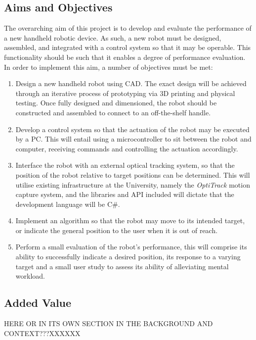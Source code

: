 \documentclass[11pt]{article}
\begin{document}
\subsection{Aims and Objectives}
The overarching aim of this project is to develop and evaluate the performance of a new handheld robotic device. As such, a new robot must be designed, assembled, and integrated with a control system so that it may be operable. This functionality should be such that it enables a degree of performance evaluation. In order to implement this aim, a number of objectives must be met:
\begin{enumerate}
\item{Design a new handheld robot using CAD. The exact design will be achieved through an iterative process of prototyping via 3D printing and physical testing. Once fully designed and dimensioned, the robot should be constructed and assembled to connect to an off-the-shelf handle.}
\item{Develop a control system so that the actuation of the robot may be executed by a PC. This will entail using a microcontroller to sit between the robot and computer, receiving commands and controlling the actuation accordingly.}
\item{Interface the robot with an external optical tracking system, so that the position of the robot relative to target positions can be determined. This will utilise existing infrastructure at the University, namely the \textit{OptiTrack} motion capture system, and the libraries and API included will dictate that the development language will be C\#.}
\item{Implement an algorithm so that the robot may move to its intended target, or indicate the general position to the user when it is out of reach.}
\item{Perform a small evaluation of the robot's performance, this will comprise its ability to successfully indicate a desired position, its response to a varying target and a small user study to assess its ability of alleviating mental workload.}
\end{enumerate}

\subsection{Added Value}
HERE OR IN ITS OWN SECTION IN THE BACKGROUND AND CONTEXT???XXXXXX
\end{document}

